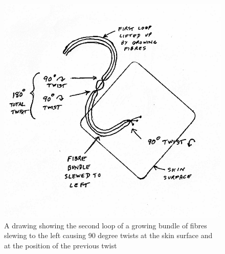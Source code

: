 %

\begin{figure}[!h]
  \centering
  \includegraphics[width=1.1\textwidth]{fig14bfilt.png}
  \caption{A drawing showing the second loop of a growing bundle of fibres slewing to the left causing 90 degree twists at the skin surface and at the position of the previous twist}
  \label{twist2}
\end{figure}

%

